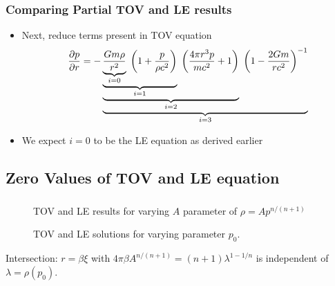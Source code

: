 \begin{frame}
	\frametitle{Comparing Partial TOV and LE results}
	\begin{itemize}
		\item Next, reduce terms present in TOV equation
		\begin{equation}
			\frac{\partial p}{\partial r} = -\underbrace{\underbrace{\underbrace{\underbrace{\frac{Gm\rho}{r^2}}_{i=0}\hspace{0.1cm}\left(1+\frac{p}{\rho c^2}\right)}_{i=1}\hspace{0.1cm}\left(\frac{4\pi r^3p}{mc^2}+1\right)}_{i=2}\hspace{0.1cm}\left(1-\frac{2Gm}{rc^2}\right)^{-1}}_{i=3}
		\end{equation}
		\item We expect $i=0$ to be the LE equation as derived earlier
	\end{itemize}
\end{frame}


\begin{frame}
	\begin{figure}
		\centering
	\end{figure}
\end{frame}


\subsection{Zero Values of TOV and LE equation}
\begin{frame}
	\frametitle{\insertsubsection}
	\begin{figure}
		\centering
		\caption{TOV and LE results for varying $A$ parameter of $\rho=Ap^{n/(n+1)}$}
	\end{figure}
\end{frame}

\begin{frame}
	\begin{figure}
		\centering
		\caption{TOV and LE solutions for varying parameter $p_0$.}
	\end{figure}
	Intersection: $r=\beta\xi$ with $4\pi\beta A^{n/(n+1)}=(n+1)\lambda^{1-1/n}$ is independent of $\lambda=\rho(p_0)$.
\end{frame}

